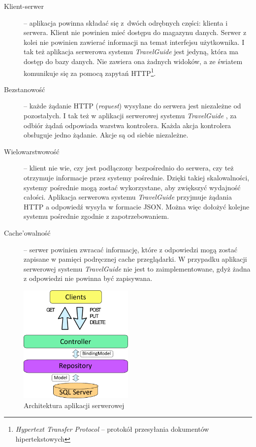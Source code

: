 \documentclass{book}
\newcommand{\appName}{\emph{TravelGuide} }
\begin{document}
			\begin{description}
				
				\item[Klient-serwer] -- aplikacja powinna składać się z~dwóch odrębnych części: klienta i serwera. Klient nie powinien mieć dostępu do magazynu danych. Serwer z kolei nie powinien zawierać informacji na temat interfejsu użytkownika. I tak też aplikacja serwerowa systemu \appName jest jedyną, która ma dostęp do bazy danych. Nie zawiera ona żadnych widoków, a ze światem 				komunikuje się za pomocą zapytań HTTP\footnote{\emph{Hypertext Transfer Protocol} – protokół przesyłania dokumentów hipertekstowych}.
				\item[Bezstanowość] -- każde żądanie HTTP (\emph{request}) wysyłane do serwera jest niezależne od pozostałych. I tak też w aplikacji serwerowej systemu \appName, za odbiór żądań odpowiada warstwa kontrolera. Każda akcja kontrolera obsługuje jedno żądanie. Akcje są od siebie niezależne.
				\item[Wielowarstwowość] -- klient nie wie, czy jest podłączony bezpośrednio do serwera, czy też otrzymuje informacje przez systemy pośrednie. Dzięki takiej skalowalności, systemy pośrednie mogą zostać wykorzystane, aby zwiększyć wydajność całości. Aplikacja serwerowa systemu \appName przyjmuje żądania HTTP a odpowiedź wysyła w formacie JSON. Można więc dołożyć kolejne systemu pośrednie zgodnie z zapotrzebowaniem. 
				\item[Cache'owalność] --  %
				serwer powinien zwracać informację, które z odpowiedzi mogą zostać zapisane w pamięci podręcznej cache przeglądarki. W przypadku aplikacji serwerowej systemu \appName nie jest to zaimplementowane, gdyż żadna z odpowiedzi nie powinna być zapisywana.
				
			\end{description}
			
			\begin{figure}
							\centering
							\includegraphics[width=0.5\textwidth]{images/architektura_server.pdf}
							\caption{Architektura aplikacji serwerowej}
							\label{fig:architektura_server}
		    \end{figure}
						
\end{document}
